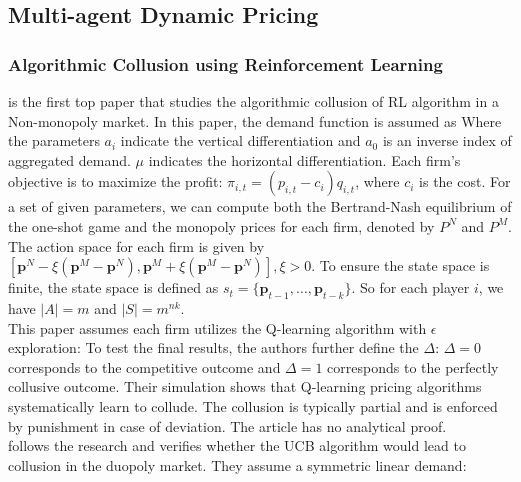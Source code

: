 \documentclass[12pt]{report}
\begin{document}
\subsection{Multi-agent Dynamic Pricing}

\subsubsection{Algorithmic Collusion using Reinforcement Learning}
\cite{calvano2020artificial} is the first top paper that studies the algorithmic collusion of RL algorithm in a Non-monopoly market.
In this paper, the demand function is assumed as
Where the parameters $a_i$ indicate the vertical differentiation and $a_0$ is an inverse index of aggregated demand. $\mu$ indicates the
horizontal differentiation. Each firm's objective is to maximize the profit: $\pi_{i,t}=\left(p_{i,t}-c_{i}\right)q_{i,t}$, where $c_i$ is the cost.
For a set of given parameters, we can compute both the Bertrand-Nash equilibrium of the one-shot game and the monopoly prices for each firm, denoted by $P^N$ and $P^M$.
The action space for each firm is given by $\left[\mathbf{p}^N-\xi(\mathbf{p}^M-\mathbf{p}^N),\mathbf{p}^M+\xi(\mathbf{p}^M-\mathbf{p}^N)\right], \xi>0$.
To ensure the state space is finite, the state space is defined as $s_t=\{\mathbf{p}_{t-1},\ldots,\mathbf{p}_{t-k}\}$. So for each player $i$, we have $|A|=m$ and $|S|=m^{nk}$. \\
This paper assumes each firm utilizes the Q-learning algorithm with $\epsilon$ exploration:
To test the final results, the authors further define the  $\Delta$:
$\Delta=0$ corresponds to the competitive outcome and $\Delta=1$ corresponds to the perfectly collusive outcome. Their simulation shows that Q-learning pricing
algorithms systematically learn to collude. The collusion is typically partial and is enforced by punishment in case of deviation. The article has no analytical proof.\\
\cite{hansen2021frontiers} follows the research and verifies whether the UCB algorithm would lead to collusion in the duopoly market. They assume a symmetric linear demand:
\end{document}
